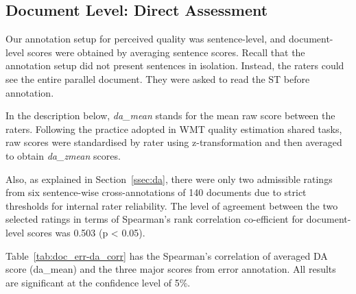 

\subsection{\label{ssec:doc_da_res}Document Level: Direct Assessment}
Our annotation setup for perceived quality was sentence-level, and document-level scores were obtained by averaging sentence scores. Recall that the annotation setup did not present sentences in isolation. Instead, the raters could see the entire parallel document. They were asked to read the ST before annotation. 

In the description below, \textit{da\_mean} stands for the mean raw score between the raters. 
Following the practice adopted in \gls{WMT} quality estimation shared tasks, raw scores were standardised by rater using z-transformation and then averaged to obtain \textit{da\_zmean} scores. %

Also, as explained in Section~\ref{ssec:da}, there were only two admissible ratings from six sentence-wise cross-annotations of 140 documents due to strict thresholds for internal rater reliability. 
The level of agreement between the two selected ratings in terms of Spearman's rank correlation co-efficient for document-level scores was 0.503 (p < 0.05). %

Table~\ref{tab:doc_err-da_corr} has the Spearman's correlation of averaged DA score (da\_mean) and the three major scores from error annotation. All results are significant at the confidence level of 5\%.

